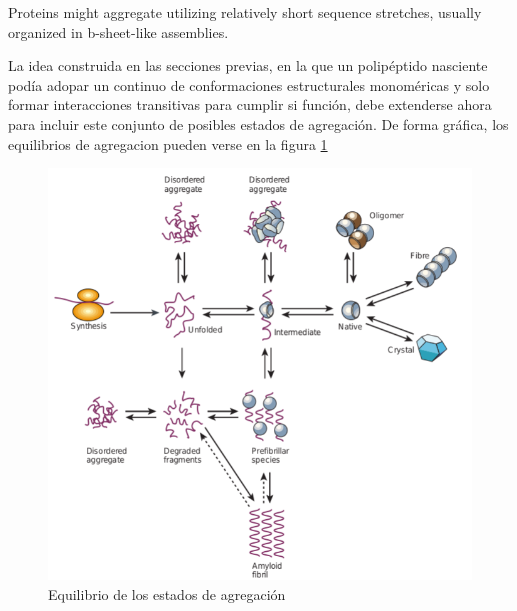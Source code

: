 Proteins might aggregate utilizing relatively short sequence stretches, usually organized in b-sheet-like assemblies. 


La idea construida en las secciones previas, en la que un polipéptido nasciente podía adopar un continuo de conformaciones estructurales monoméricas y solo formar interacciones transitivas para cumplir si función, 
debe extenderse ahora para incluir este conjunto de posibles estados de agregación. 
De forma gráfica, los equilibrios de agregacion pueden verse en la figura \ref{aggregationDiagram}

\begin{figure}[h!,centered]
\includegraphics[width=\textwidth]{img/aggregationDiagram.png} 
\caption{Equilibrio de los estados de agregación} \label{aggregationDiagram}
\end{figure}


